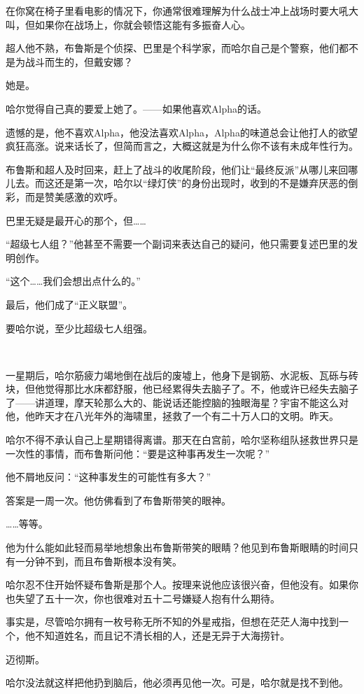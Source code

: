 \documentclass[../main]{subfiles}
\begin{document}
在你窝在椅子里看电影的情况下，你通常很难理解为什么战士冲上战场时要大吼大叫，但如果你在战场上，你就会顿悟这能有多振奋人心。

超人他不熟，布鲁斯是个侦探、巴里是个科学家，而哈尔自己是个警察，他们都不是为战斗而生的，但戴安娜？

她是。

哈尔觉得自己真的要爱上她了。——如果他喜欢Alpha的话。

遗憾的是，他不喜欢Alpha，他没法喜欢Alpha，Alpha的味道总会让他打人的欲望疯狂高涨。说来话长了，但简而言之，大概这就是为什么你不该有未成年性行为。

布鲁斯和超人及时回来，赶上了战斗的收尾阶段，他们让“最终反派”从哪儿来回哪儿去。而这还是第一次，哈尔以“绿灯侠”的身份出现时，收到的不是嫌弃厌恶的倒彩，而是赞美感激的欢呼。

巴里无疑是最开心的那个，但……

“超级七人组？”他甚至不需要一个副词来表达自己的疑问，他只需要复述巴里的发明创作。

“这个……我们会想出点什么的。”

最后，他们成了“正义联盟”。

要哈尔说，至少比超级七人组强。

~\

一星期后，哈尔筋疲力竭地倒在战后的废墟上，他身下是钢筋、水泥板、瓦砾与砖块，但他觉得那比水床都舒服，他已经累得失去脑子了。不，他或许已经失去脑子了——讲道理，摩天轮那么大的、能说话还能控脑的独眼海星？宇宙不能这么对他，他昨天才在八光年外的海啸里，拯救了一个有二十万人口的文明。昨天。

哈尔不得不承认自己上星期错得离谱。那天在白宫前，哈尔坚称组队拯救世界只是一次性的事情，而布鲁斯问他：“要是这种事再发生一次呢？”

他不屑地反问：“这种事发生的可能性有多大？”

答案是一周一次。他仿佛看到了布鲁斯带笑的眼神。

……等等。

他为什么能如此轻而易举地想象出布鲁斯带笑的眼睛？他见到布鲁斯眼睛的时间只有一分钟不到，而且布鲁斯根本没有笑。

哈尔忍不住开始怀疑布鲁斯是那个人。按理来说他应该很兴奋，但他没有。如果你也失望了五十一次，你也很难对五十二号嫌疑人抱有什么期待。

事实是，尽管哈尔拥有一枚号称无所不知的外星戒指，但想在茫茫人海中找到一个，他不知道姓名，而且记不清长相的人，还是无异于大海捞针。

迈彻斯。

哈尔没法就这样把他扔到脑后，他必须再见他一次。可是，哈尔就是找不到他。
\end{document}
